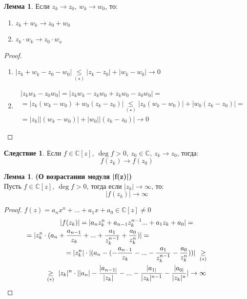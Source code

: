 \documentclass[a4paper, 12pt]{article}
\newcommand\tab[1][.5cm]{\hspace*{#1}}
\newcounter{lemcount}
\newcounter{lemcount2}
\theoremstyle{definition}
\newtheorem*{consequense}{Следствие}
\newtheorem{lemmanum}[lemcount]{Лемма}
\begin{document}
  \begin{lemmanum}
    Если $z_k \to z_0, \ w_k \to w_0$, то:
    \begin{enumerate}
      \item $z_k + w_k \to z_0 + w_0$
      \item $z_k \cdot w_k \to z_0 \cdot w_o$  
    \end{enumerate}
  \end{lemmanum} 
  \begin{proof}\tab
    \begin{enumerate}
      \item $|z_k+w_k-z_0-w_0| \underset{(\star)}{\leq} |z_k - z_0| + |w_k - w_0| \to 0$
      \item 
      \begin{multline*}
        |z_k w_k-z_0w_0| = |z_k w_k-z_kw_0 + z_k w_0-z_0w_0 | =\\
        = |z_k(w_k - w_0) + w_0(z_k - z_0)| \underset{(\star)}{\leq}  |z_k(w_k - w_0)| + |w_0(z_k - z_0)| =\\
        = |z_k||(w_k - w_0)| + |w_0||(z_k - z_0)| \to 0
      \end{multline*}
    \end{enumerate}
  \end{proof} 
  \begin{consequense}
    Если $f \in \mathbb{C}[z], \ \deg f >0, \ z_0 \in \mathbb{C}, \ z_k \to z_0$, тогда: 
    $$f(z_k) \to f(z_0)$$  
  \end{consequense}
  \begin{lemmanum} \textbf{(О возрастании модуля |f(z)|)} \\
    Пусть $f \in \mathbb{C}[z], \ \deg f >0$, тогда если $|z_k| \to \infty$, то:
    $$|f(z_k)| \to \infty$$        
  \end{lemmanum} 
  \begin{proof}
    $f(z) = a_nx^n + ... + a_1x+a_0 \in \mathbb{C}[z] \neq 0$
    \begin{multline*}
      |f(z_k)| = |a_nz_k^n + a_{n-1}z_k^{n-1}... + a_1z_k+a_0| =\\
      \tab[-4cm]= |z_k^n \cdot (a_n+\frac{a_{n-1}}{z_k} + ... + \frac{a_{1}}{z_k^{n-1}} + \frac{a_{0}}{z_k^{n}})|=\\
      \tab[1cm]= |z_k^n| \cdot |(a_n - (-\frac{a_{n-1}}{z_k} - ... - \frac{a_{1}}{z_k^{n-1}} - \frac{a_{0}}{z_k^{n}}))| \ \underset{(*)}{\geq}\\
      \underset{(*)}{\geq} \ |z_k|^n \cdot ||a_n|-\frac{|a_{n-1|}}{|z_k|} - ... - \frac{|a_{1|}}{|z_k|^{n-1}} - \frac{|a_{0|}}{|z_k|^{n}}| \to \infty
    \end{multline*} 
  \end{proof} 
\end{document}
